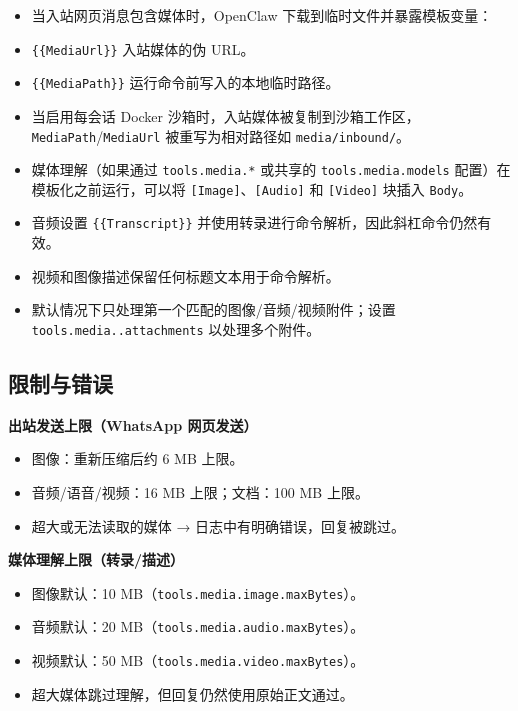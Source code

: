 \begin{itemize}
  \item 当入站网页消息包含媒体时，OpenClaw 下载到临时文件并暴露模板变量：
  \item \texttt{\{\{MediaUrl\}\}} 入站媒体的伪 URL。
  \item \texttt{\{\{MediaPath\}\}} 运行命令前写入的本地临时路径。
  \item 当启用每会话 Docker 沙箱时，入站媒体被复制到沙箱工作区，\texttt{MediaPath}/\texttt{MediaUrl} 被重写为相对路径如 \texttt{media/inbound/}。
  \item 媒体理解（如果通过 \texttt{tools.media.*} 或共享的 \texttt{tools.media.models} 配置）在模板化之前运行，可以将 \texttt{[Image]}、\texttt{[Audio]} 和 \texttt{[Video]} 块插入 \texttt{Body}。
  \item 音频设置 \texttt{\{\{Transcript\}\}} 并使用转录进行命令解析，因此斜杠命令仍然有效。
  \item 视频和图像描述保留任何标题文本用于命令解析。
  \item 默认情况下只处理第一个匹配的图像/音频/视频附件；设置 \texttt{tools.media..attachments} 以处理多个附件。
\end{itemize}


\subsection{限制与错误}


\textbf{出站发送上限（WhatsApp 网页发送）}

\begin{itemize}
  \item 图像：重新压缩后约 6 MB 上限。
  \item 音频/语音/视频：16 MB 上限；文档：100 MB 上限。
  \item 超大或无法读取的媒体 → 日志中有明确错误，回复被跳过。
\end{itemize}


\textbf{媒体理解上限（转录/描述）}

\begin{itemize}
  \item 图像默认：10 MB（\texttt{tools.media.image.maxBytes}）。
  \item 音频默认：20 MB（\texttt{tools.media.audio.maxBytes}）。
  \item 视频默认：50 MB（\texttt{tools.media.video.maxBytes}）。
  \item 超大媒体跳过理解，但回复仍然使用原始正文通过。
\end{itemize}


